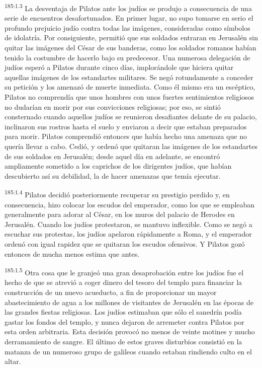 \par 
\textsuperscript{185:1.3} La desventaja de Pilatos ante los judíos se produjo a consecuencia de una serie de encuentros desafortunados. En primer lugar, no supo tomarse en serio el profundo prejuicio judío contra todas las imágenes, consideradas como símbolos de idolatría. Por consiguiente, permitió que sus soldados entraran en Jerusalén sin quitar las imágenes del César de sus banderas, como los soldados romanos habían tenido la costumbre de hacerlo bajo su predecesor. Una numerosa delegación de judíos esperó a Pilatos durante cinco días, implorándole que hiciera quitar aquellas imágenes de los estandartes militares. Se negó rotundamente a conceder su petición y los amenazó de muerte inmediata. Como él mismo era un escéptico, Pilatos no comprendía que unos hombres con unos fuertes sentimientos religiosos no dudarían en morir por sus convicciones religiosas; por eso, se sintió consternado cuando aquellos judíos se reunieron desafiantes delante de su palacio, inclinaron sus rostros hasta el suelo y enviaron a decir que estaban preparados para morir. Pilatos comprendió entonces que había hecho una amenaza que no quería llevar a cabo. Cedió, y ordenó que quitaran las imágenes de los estandartes de sus soldados en Jerusalén; desde aquel día en adelante, se encontró ampliamente sometido a los caprichos de los dirigentes judíos, que habían descubierto así su debilidad, la de hacer amenazas que temía ejecutar.

\par 
\textsuperscript{185:1.4} Pilatos decidió posteriormente recuperar su prestigio perdido y, en consecuencia, hizo colocar los escudos del emperador, como los que se empleaban generalmente para adorar al César, en los muros del palacio de Herodes en Jerusalén. Cuando los judíos protestaron, se mantuvo inflexible. Como se negó a escuchar sus protestas, los judíos apelaron rápidamente a Roma, y el emperador ordenó con igual rapidez que se quitaran los escudos ofensivos. Y Pilatos gozó entonces de mucha menos estima que antes.

\par 
\textsuperscript{185:1.5} Otra cosa que le granjeó una gran desaprobación entre los judíos fue el hecho de que se atrevió a coger dinero del tesoro del templo para financiar la construcción de un nuevo acueducto, a fin de proporcionar un mayor abastecimiento de agua a los millones de visitantes de Jerusalén en las épocas de las grandes fiestas religiosas. Los judíos estimaban que sólo el sanedrín podía gastar los fondos del templo, y nunca dejaron de arremeter contra Pilatos por esta orden arbitraria. Esta decisión provocó no menos de veinte motines y mucho derramamiento de sangre. El último de estos graves disturbios consistió en la matanza de un numeroso grupo de galileos cuando estaban rindiendo culto en el altar.

